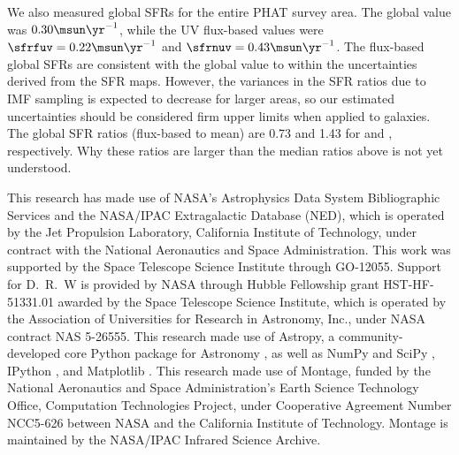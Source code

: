 We also measured global SFRs for the entire PHAT survey area. The global
\sfroneh{} value was $0.30\msun\yr^{-1}$, while the UV flux-based values were
$\sfrfuv = 0.22\msun\yr^{-1}$ and $\sfrnuv = 0.43\msun\yr^{-1}$. The flux-based
global SFRs are consistent with the global \sfroneh{} value to within the
uncertainties derived from the SFR maps. However, the variances in the SFR
ratios due to IMF sampling is expected to decrease for larger areas, so our
estimated uncertainties should be considered firm upper limits when applied to
galaxies. The global SFR ratios (flux-based to mean) are 0.73 and 1.43 for
\fuv{} and \nuv{}, respectively. Why these ratios are larger than the median
ratios above is not yet understood.

This research has made use of NASA's Astrophysics Data System Bibliographic
Services and the NASA/IPAC Extragalactic Database (NED), which is operated by
the Jet Propulsion Laboratory, California Institute of Technology, under
contract with the National Aeronautics and Space Administration. This work was
supported by the Space Telescope Science Institute through GO-12055. Support
for D.~R.~W is provided by NASA through Hubble Fellowship grant HST-HF-51331.01
awarded by the Space Telescope Science Institute, which is operated by the
Association of Universities for Research in Astronomy, Inc., under NASA
contract NAS 5-26555. This research made use of Astropy, a community-developed
core Python package for Astronomy \citep{Astropy_Collaboration:2013}, as well
as NumPy and SciPy \citep{Oliphant:2007}, IPython \citep{Perez:2007}, and
Matplotlib \citep{Hunter:2007}. This research made use of Montage, funded by
the National Aeronautics and Space Administration's Earth Science Technology
Office, Computation Technologies Project, under Cooperative Agreement Number
NCC5-626 between NASA and the California Institute of Technology. Montage is
maintained by the NASA/IPAC Infrared Science Archive.

